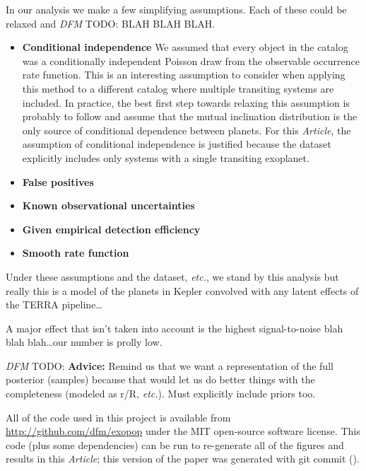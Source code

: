 \documentclass[12pt,preprint]{aastex}
\newcommand{\paper}{\textsl{Article}}
\newcommand{\foreign}[1]{\emph{#1}}
\newcommand{\etc}{\foreign{etc.}}
\newcommand{\todo}[3]{{\color{#2} \emph{#1} TODO: #3}}
\newcommand{\dfmtodo}[1]{\todo{DFM}{red}{#1}}
\begin{document}
In our analysis we make a few simplifying assumptions.
Each of these could be relaxed and \dfmtodo{BLAH BLAH BLAH}.
\begin{itemize}

\item {\bf Conditional independence}\quad
We assumed that every object in the catalog was a conditionally independent
Poisson draw from the observable occurrence rate function.
This is an interesting assumption to consider when applying this method to a
different catalog where multiple transiting systems are included.
In practice, the best first step towards relaxing this assumption is probably
to follow \citet{tremaine} and assume that the mutual inclination distribution
is the only source of conditional dependence between planets.
For this \paper, the assumption of conditional independence is justified
because the dataset explicitly includes only systems with a single transiting
exoplanet.

\item {\bf False positives}\quad

\item {\bf Known observational uncertainties}\quad

\item {\bf Given empirical detection efficiency}\quad

\item {\bf Smooth rate function}\quad

\end{itemize}

Under these assumptions and the dataset, \etc, we stand by this analysis but
really this is a model of the planets in Kepler convolved with any latent
effects of the TERRA pipeline\ldots

A major effect that isn't taken into account is the highest signal-to-noise
blah blah blah\ldots our number is prolly low.

\dfmtodo{%
{\bf Advice:} \quad
Remind us that we want a representation of the full posterior (samples)
because that would let us do better things with the completeness (modeled as
r/R, \etc).
Must explicitly include priors too.
}


All of the code used in this project is available from
\url{http://github.com/dfm/exopop} under the MIT open-source software license.
This code (plus some dependencies) can be run to re-generate all of the
figures and results in this \paper; this version of the paper was generated
with git commit \texttt{\githash} (\gitdate).
\end{document}
